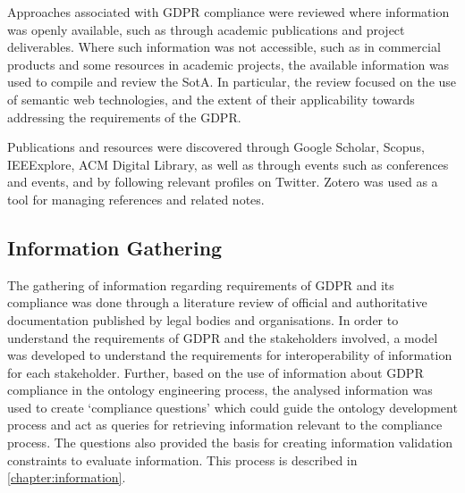Approaches associated with GDPR compliance were reviewed where information was openly available, such as through academic publications and project deliverables.
Where such information was not accessible, such as in commercial products and some resources in academic projects, the available information was used to compile and review the SotA.
In particular, the review focused on the use of semantic web technologies, and the extent of their applicability towards addressing the requirements of the GDPR.

Publications and resources were discovered through Google Scholar, Scopus, IEEExplore, ACM Digital Library, as well as through events such as conferences and events, and by following relevant profiles on Twitter.
Zotero was used as a tool for managing references and related notes.

\subsection{Information Gathering}
The gathering of information regarding requirements of GDPR and its compliance was done through a literature review of official and authoritative documentation published by legal bodies and organisations.
In order to understand the requirements of GDPR and the stakeholders involved, a model was developed to understand the requirements for interoperability of information for each stakeholder.
Further, based on the use of information about GDPR compliance in the ontology engineering process, the analysed information was used to create `compliance questions' which could guide the ontology development process and act as queries for retrieving information relevant to the compliance process. The questions also provided the basis for creating information validation constraints to evaluate information.
This process is described in \autoref{chapter:information}.

